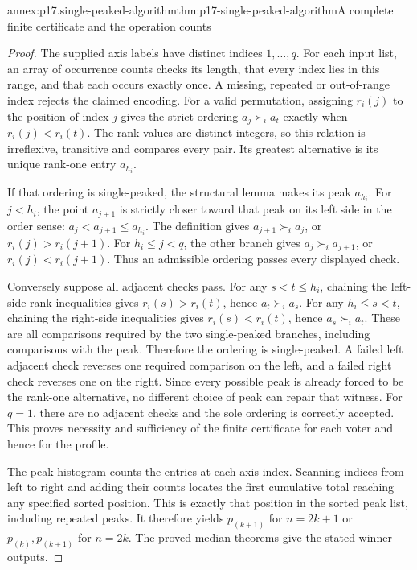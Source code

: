 \begin{annexitem}{annex:p17.single-peaked-algorithm}{thm:p17-single-peaked-algorithm}{A complete finite certificate and the operation counts}
\begin{proof}
The supplied axis labels have distinct indices \(1,\ldots,q\).
For each input list, an array of occurrence counts checks its length,
that every index lies in this range, and that each occurs exactly once.
A missing, repeated or out-of-range index rejects the claimed encoding.
For a valid permutation, assigning \(r_i(j)\) to the position of
index \(j\) gives the strict ordering
\(a_j\succ_i a_t\) exactly when \(r_i(j)<r_i(t)\).
The rank values are distinct integers, so this relation is irreflexive,
transitive and compares every pair. Its greatest alternative is its
unique rank-one entry \(a_{h_i}\).

If that ordering is single-peaked, the structural lemma makes its peak
\(a_{h_i}\). For \(j<h_i\), the point \(a_{j+1}\) is strictly
closer toward that peak on its left side in the order sense:
\(a_j<a_{j+1}\leq a_{h_i}\). The definition gives
\(a_{j+1}\succ_i a_j\), or \(r_i(j)>r_i(j+1)\).
For \(h_i\leq j<q\), the other branch gives
\(a_j\succ_i a_{j+1}\), or \(r_i(j)<r_i(j+1)\).
Thus an admissible ordering passes every displayed check.

Conversely suppose all adjacent checks pass. For any
\(s<t\leq h_i\), chaining the left-side rank inequalities gives
\(r_i(s)>r_i(t)\), hence \(a_t\succ_i a_s\).
For any \(h_i\leq s<t\), chaining the right-side inequalities
gives \(r_i(s)<r_i(t)\), hence \(a_s\succ_i a_t\).
These are all comparisons required by the two single-peaked branches,
including comparisons with the peak. Therefore the ordering is
single-peaked. A failed left adjacent check reverses one required
comparison on the left, and a failed right check reverses one on the
right. Since every possible peak is already forced to be the rank-one
alternative, no different choice of peak can repair that witness.
For \(q=1\), there are no adjacent checks and the sole ordering
is correctly accepted. This proves necessity and sufficiency of the
finite certificate for each voter and hence for the profile.

The peak histogram counts the entries at each axis index. Scanning
indices from left to right and adding their counts locates the first
cumulative total reaching any specified sorted position. This is
exactly that position in the sorted peak list, including repeated
peaks. It therefore yields \(p_{(k+1)}\) for \(n=2k+1\) or
\(p_{(k)},p_{(k+1)}\) for \(n=2k\). The proved median theorems
give the stated winner outputs.


\end{proof}
\end{annexitem}
